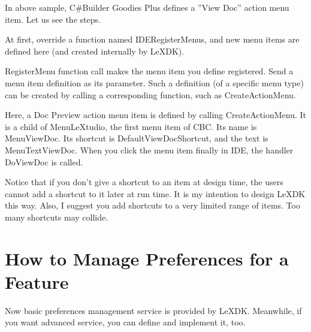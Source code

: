 In above sample, C\#Builder Goodies Plus defines a ''View Doc'' action menu 
item. Let us see the steps.

At first, override a function named IDERegisterMenus, and new menu items are 
defined here (and created internally by LeXDK).


RegisterMenu function call makes the menu item you define registered. Send a 
menu item definition as its parameter. Such a definition (of a specific menu 
type) can be created by calling a corresponding function, such as 
CreateActionMenu.

Here, a Doc Preview action menu item is defined by calling CreateActionMenu. It 
is a child of MenuLeXtudio, the first menu item of CBC. Its name is 
MenuViewDoc. Its shortcut is DefaultViewDocShortcut, and the text is 
MenuTextViewDoc. When you click the menu item finally in IDE, the handler 
DoViewDoc is called.



Notice that if you don't give a shortcut to an item at design time, the users 
cannot add a shortcut to it later at run time. It is my intention to design 
LeXDK this way. Also, I suggest you add shortcuts to a very limited range of 
items. Too many shortcuts may collide.

\section{How to Manage Preferences for a Feature}
Now basic preferences management service is provided by LeXDK. Meanwhile, if 
you want advanced service, you can define and implement it, too.

